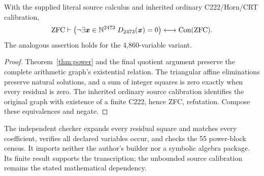 \begin{theorem}
With the supplied literal source calculus and inherited ordinary
C222/Horn/CRT calibration,
\[
 \mathrm{ZFC}\vdash
 \bigl(\neg\exists\boldsymbol{x}\in\mathbb N^{2473}\;
 D_{2473}(\boldsymbol{x})=0\bigr)\longleftrightarrow\operatorname{Con}(\mathrm{ZFC}).
\]
The analogous assertion holds for the 4,860-variable variant.
\end{theorem}
\begin{proof}
Theorem~\ref{thm:power} and the final quotient argument preserve the
complete arithmetic graph's existential relation. The triangular affine
eliminations preserve natural solutions, and a sum of integer squares
is zero exactly when every residual is zero. The inherited ordinary
source calibration identifies the original graph with existence of a
finite C222, hence ZFC, refutation. Compose these equivalences and negate.
\end{proof}
The independent checker expands every residual square and matches every
coefficient, verifies all declared variables occur, and checks the 55
power-block census. It imports neither the author's builder nor a symbolic
algebra package. Its finite result supports the transcription; the
unbounded source calibration remains the stated mathematical dependency.

